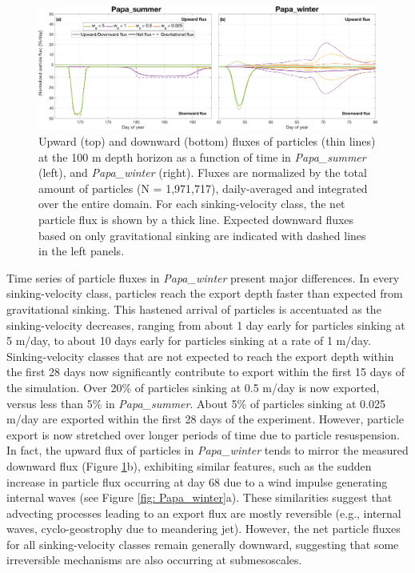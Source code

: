 \documentclass[draft,linenumbers]{agujournal2018}
\begin{document}
\begin{figure}[ht]
	\centering
	\includegraphics[width = 1\linewidth]{figures/Fig6_particle_export_flux.png}
	\caption{Upward (top) and downward (bottom) fluxes of particles (thin lines) at the 100 m depth horizon as a function of time in \textit{Papa\_summer} (left), and \textit{Papa\_winter} (right). Fluxes are normalized by the total amount of particles (N = 1,971,717), daily-averaged and integrated over the entire domain. For each sinking-velocity class, the net particle flux is shown by a thick line. Expected downward fluxes based on only gravitational sinking are indicated with dashed lines in the left panels.}
	\label{fig: particle_export}
\end{figure}

Time series of particle fluxes in \textit{Papa\_winter} present major differences. In every sinking-velocity class, particles reach the export depth faster than expected from gravitational sinking. This hastened arrival of particles is accentuated as the sinking-velocity decreases, ranging from about 1 day early for particles sinking at 5 m/day, to about 10 days early for particles sinking at a rate of 1 m/day. Sinking-velocity classes that are not expected to reach the export depth within the first 28 days now significantly contribute to export within the first 15 days of the simulation. Over 20\% of particles sinking at 0.5 m/day is now exported, versus less than 5\% in \textit{Papa\_summer}. About 5\% of particles sinking at 0.025 m/day are exported within the first 28 days of the experiment. However, particle export is now stretched over longer periods of time due to particle resuspension. In fact, the upward flux of particles in \textit{Papa\_winter} tends to mirror the measured downward flux (Figure \ref{fig: particle_export}b), exhibiting similar features, such as the sudden increase in particle flux occurring at day 68 due to a wind impulse generating internal waves (see Figure \ref{fig: Papa_winter}a). These similarities suggest that advecting processes leading to an export flux are mostly reversible (e.g., internal waves, cyclo-geostrophy due to meandering jet). However, the net particle fluxes for all sinking-velocity classes remain generally downward, suggesting that some irreversible mechanisms are also occurring at submesoscales.
\end{document}
